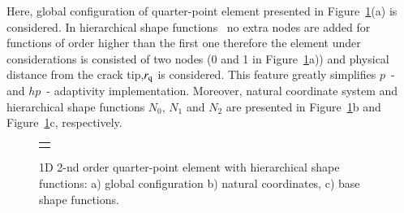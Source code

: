 \documentclass[11pt]{acmeArticle}
\numberwithin{equation}{section}
\begin{document}
Here, global configuration of quarter-point element presented in Figure~\ref{fig:shape_funcs}(a) is considered.
In hierarchical shape functions~\citep{Ainsworth2003} no extra nodes are added for functions of order higher than the first one therefore the element under considerations is consisted of two nodes (0 and 1 in Figure~\ref{fig:shape_funcs}a)) and physical distance from the crack tip,$r_{\rm q}$ is considered. 
This feature greatly simplifies $p$~- and $hp$~- adaptivity implementation.
Moreover, natural coordinate system and hierarchical shape functions $N_0$, $N_1$ and $N_2$ are presented in Figure~\ref{fig:shape_funcs}b and Figure~\ref{fig:shape_funcs}c, respectively.
\begin{figure}[h!]
	\begin{center}
		\begin{tabular}{c}
			{\def\svgwidth{15cm} } \\ %
		\end{tabular}
		\caption{1D 2-nd order quarter-point element with hierarchical shape functions: a) global configuration b) natural coordinates, c) base shape functions.}
		\label{fig:shape_funcs}
	\end{center}
\end{figure}
\end{document}

